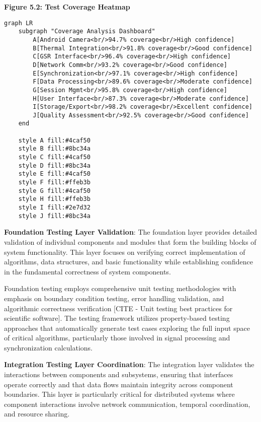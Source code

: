 \documentclass[12pt,a4paper]{article}
\begin{document}
\textbf{Figure 5.2: Test Coverage Heatmap}

\begin{verbatim}
graph LR
    subgraph "Coverage Analysis Dashboard"
        A[Android Camera<br/>94.7% coverage<br/>High confidence]
        B[Thermal Integration<br/>91.8% coverage<br/>Good confidence]
        C[GSR Interface<br/>96.4% coverage<br/>High confidence]
        D[Network Comm<br/>93.2% coverage<br/>Good confidence]
        E[Synchronization<br/>97.1% coverage<br/>High confidence]
        F[Data Processing<br/>89.6% coverage<br/>Moderate confidence]
        G[Session Mgmt<br/>95.8% coverage<br/>High confidence]
        H[User Interface<br/>87.3% coverage<br/>Moderate confidence]
        I[Storage/Export<br/>98.2% coverage<br/>Excellent confidence]
        J[Quality Assessment<br/>92.5% coverage<br/>Good confidence]
    end
    
    style A fill:#4caf50
    style B fill:#8bc34a
    style C fill:#4caf50
    style D fill:#8bc34a
    style E fill:#4caf50
    style F fill:#ffeb3b
    style G fill:#4caf50
    style H fill:#ffeb3b
    style I fill:#2e7d32
    style J fill:#8bc34a
\end{verbatim}

\textbf{Foundation Testing Layer Validation}: The foundation layer provides detailed validation of individual components and
modules that form the building blocks of system functionality. This layer focuses on verifying correct implementation of
algorithms, data structures, and basic functionality while establishing confidence in the fundamental correctness of
system components.

Foundation testing employs comprehensive unit testing methodologies with emphasis on boundary condition testing, error
handling validation, and algorithmic correctness
verification [CITE - Unit testing best practices for scientific software]. The testing framework utilizes property-based
testing approaches that automatically generate test cases exploring the full input space of critical algorithms,
particularly those involved in signal processing and synchronization calculations.

\textbf{Integration Testing Layer Coordination}: The integration layer validates the interactions between components and
subsystems, ensuring that interfaces operate correctly and that data flows maintain integrity across component
boundaries. This layer is particularly critical for distributed systems where component interactions involve network
communication, temporal coordination, and resource sharing.
\end{document}
